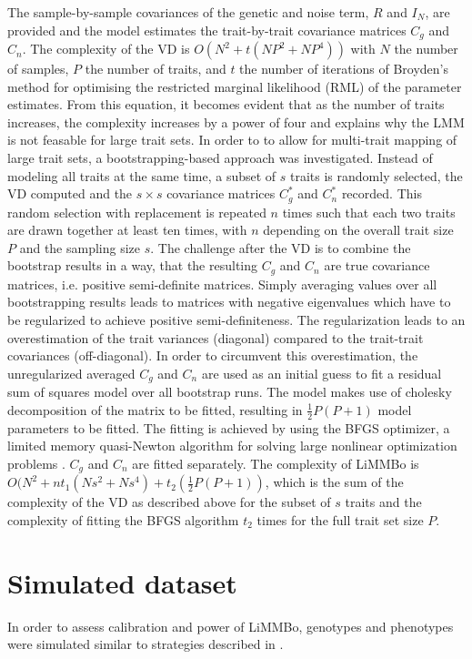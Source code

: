 The sample-by-sample covariances of the genetic and noise term, \(R\) and \(I_N\), are provided and the model estimates the trait-by-trait covariance matrices \(C_g\) and \(C_n\). The complexity of the VD is \(O(N^2 + t(NP^2 + NP^4))\) with \(N\) the number of samples, \(P\) the number of traits, and \(t\) the number of iterations of Broyden's method for optimising the restricted marginal likelihood (RML) of the parameter estimates. From this equation, it becomes evident that as the number of traits increases, the complexity increases by a power of four and explains why the LMM is not feasable for large trait sets. In order to to allow for multi-trait mapping of large trait sets, a bootstrapping-based approach was investigated. Instead of modeling all traits at the same time, a subset of \(s\) traits is randomly selected, the VD computed  and the $s \times s$ covariance matrices $C^*_g$ and $C^*_n$ recorded. This random selection with replacement is repeated \(n\) times such that each two traits are drawn together at least ten times, with \(n\) depending on the overall trait size \(P\) and the sampling size \(s\).  The challenge after the VD is to combine the bootstrap results in a way, that the resulting $C_g$ and $C_n$ are true covariance matrices, i.e. positive semi-definite matrices. Simply averaging values over all bootstrapping results leads to matrices with negative eigenvalues which have to be regularized to achieve positive semi-definiteness. The regularization leads to an overestimation of the trait variances (diagonal) compared to the trait-trait covariances (off-diagonal). In order to circumvent this overestimation, the unregularized averaged $C_g$ and $C_n$ are used as an initial guess to fit a residual sum of squares model over all bootstrap runs. The model makes use of cholesky decomposition of the matrix to be fitted, resulting in $\frac{1}{2}P(P+1)$ model parameters to be fitted. The fitting is achieved by using the BFGS optimizer, a limited memory quasi-Newton algorithm for solving large nonlinear optimization problems \citep{Byrd1995}.  $C_g$ and $C_n$ are fitted separately. The complexity of LiMMBo is \(O(N^2 + nt_1(Ns^2 + Ns^4) + t_2(\frac{1}{2}P(P+1))\), which is the sum of the complexity of the VD as described above for the subset of \(s\) traits and the complexity of fitting the BFGS algorithm \(t_2\) times for the full trait set size \(P\). 


\section{Simulated dataset}
\label{section:simulateddata}
In order to assess calibration and power of LiMMBo, genotypes and phenotypes were simulated similar to strategies described in \citep{Loh2014,Casale2015}.  
